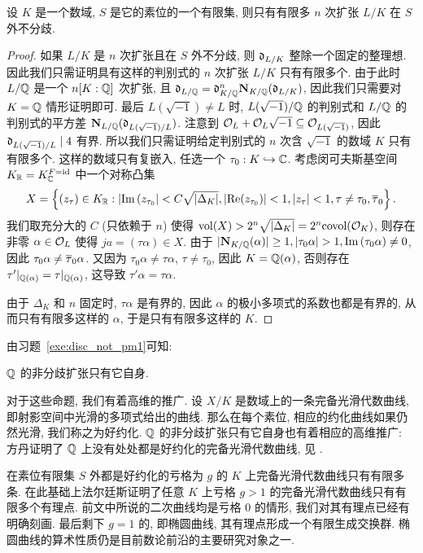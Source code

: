 \begin{theorem}{}{}
设 $K$ 是一个数域, $S$ 是它的素位的一个有限集, 则只有有限多 $n$ 次扩张 $L/K$ 在 $S$ 外不分歧.
\end{theorem}
\begin{proof}
如果 $L/K$ 是 $n$ 次扩张且在 $S$ 外不分歧, 则 ${\mathfrak{d}}_{L/K}$ 整除一个固定的整理想.
因此我们只需证明具有这样的判别式的 $n$ 次扩张 $L/K$ 只有有限多个. 由于此时 $L/{\mathbb{Q}}$ 是一个 $n[K:{\mathbb{Q}}]$ 次扩张, 且 ${\mathfrak{d}}_{L/{\mathbb{Q}}}={\mathfrak{d}}_{K/{\mathbb{Q}}}^n {\mathbf{N}}_{K/{\mathbb{Q}}}({\mathfrak{d}}_{L/K})$, 因此我们只需要对 $K={\mathbb{Q}}$ 情形证明即可. 最后 $L(\sqrt{-1})\neq L$ 时, $L(\sqrt{-1})/{\mathbb{Q}}$ 的判别式和 $L/{\mathbb{Q}}$ 的判别式的平方差 ${\mathbf{N}}_{L/{\mathbb{Q}}}({\mathfrak{d}}_{L(\sqrt{-1})/L})$. 注意到 ${\mathcal{O}}_L+{\mathcal{O}}_L\sqrt{-1}\subseteq {\mathcal{O}}_{L(\sqrt{-1})}$, 因此 ${\mathfrak{d}}_{L(\sqrt{-1})/L}\mid 4$ 有界. 所以我们只需证明给定判别式的 $n$ 次含 $\sqrt{-1}$ 的数域 $K$ 只有有限多个. 这样的数域只有复嵌入, 任选一个 $\tau_0:K\hookrightarrow {\mathbb{C}}$. 考虑闵可夫斯基空间 $K_{\mathbb{R}}=K_{\mathbb{C}}^{F={\mathrm{id}}}$ 中一个对称凸集
  \[X=\left\{(z_\tau)\in K_{\mathbb{R}}: |{\mathrm{Im}\,}(z_{\tau_0}|<C\sqrt{|\Delta_K|}, |{\mathrm{Re}}(z_{\tau_0})|<1,|z_\tau|<1,\tau\neq \tau_0,\overline\tau_0\right\}.\]
我们取充分大的 $C$ (只依赖于 $n$) 使得 ${\mathrm{vol}}(X)>2^n\sqrt{|\Delta_K|}=2^n{\mathrm{covol}}({\mathcal{O}}_K)$, 则存在非零 $\alpha\in{\mathcal{O}}_L$ 使得 $ja=(\tau\alpha)\in X$. 由于 $|\bfN_{K/\BQ}(\alpha)|\ge 1, |\tau_0\alpha|>1, \Im(\tau_0\alpha)\neq 0$, 因此 $\tau_0\alpha\neq \overline\tau_0\alpha$. 又因为 $\tau_0 \alpha\neq\tau \alpha$, $\tau\neq\tau_0$, 因此 $K={\mathbb{Q}}(\alpha)$, 否则存在 $\tau'|_{{\mathbb{Q}}(\alpha)}=\tau|_{{\mathbb{Q}}(\alpha)}$, 这导致 $\tau'\alpha=\tau\alpha$.

由于 $\Delta_K$ 和 $n$ 固定时, $\tau\alpha$ 是有界的, 因此 $\alpha$ 的极小多项式的系数也都是有界的, 从而只有有限多这样的 $\alpha$, 于是只有有限多这样的 $K$.
\end{proof}


由习题~\ref{exe:disc_not_pm1}可知:
\begin{theorem}{}{}
${\mathbb{Q}}$ 的非分歧扩张只有它自身.
\end{theorem}

对于这些命题, 我们有着高维的推广. 设 $X/K$ 是数域上的一条完备光滑代数曲线, 即射影空间中光滑的多项式给出的曲线. 那么在每个素位, 相应的约化曲线如果仍然光滑, 我们称之为好约化. ${\mathbb{Q}}$ 的非分歧扩张只有它自身也有着相应的高维推广: 方丹证明了 ${\mathbb{Q}}$ 上没有处处都是好约化的完备光滑代数曲线, 见 \cite{Fontaine1985}.

在素位有限集 $S$ 外都是好约化的亏格为 $g$ 的 $K$ 上完备光滑代数曲线只有有限多条. 在此基础上法尔廷斯证明了任意 $K$ 上亏格 $g>1$ 的完备光滑代数曲线只有有限多个有理点. 前文中所说的二次曲线均是亏格 $0$ 的情形, 我们对其有理点已经有明确刻画. 最后剩下 $g=1$ 的, 即椭圆曲线, 其有理点形成一个有限生成交换群. 椭圆曲线的算术性质仍是目前数论前沿的主要研究对象之一. 


